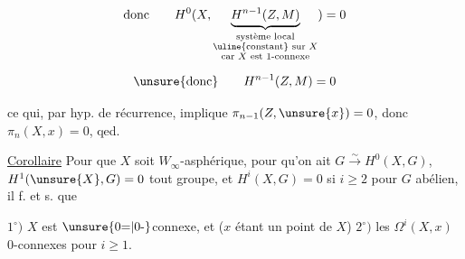 

\[
\text{donc}\qquad H^0(X,\underbrace{H^{n-1}(Z,M)}_{\substack{\text{système local}\\\text{\uline{constant} sur }X\\\text{car }X\text{ est }1\text{-connexe}}})=0
\]

\[
\text{\unsure{donc}}\qquad H^{n-1}(Z,M)=0
\]

ce qui, par hyp. de récurrence, implique $\pi_{n-1}(Z,\unsure{x})=0$, donc $\pi_n(X,x)=0$, qed.

\uline{Corollaire} Pour que $X$ soit $W_\infty$-asphérique,  pour qu'on ait  $G\xrightarrow{\sim}H^0(X,G)$, $H^1(\unsure{X},G)=0$ tout groupe, et $H^i(X,G)=0$ si $i\geqslant 2$ pour $G$ abélien, il f. et s. que 

$1^\circ)$ $X$ est $\unsure{0{=}|0\text{-}}$connexe, et ($x$ étant un point de $X$) $2^\circ)$ les $\Omega^i(X,x)$ $0$-connexes pour $i\geqslant 1$.
